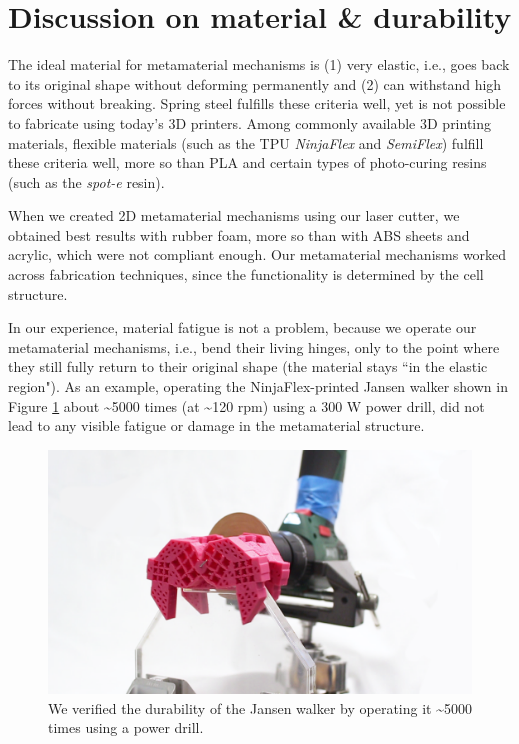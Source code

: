 \section{Discussion on material \& durability}

The ideal material for metamaterial mechanisms is (1) very elastic, i.e., goes back to its original shape without deforming permanently and (2) can withstand high forces without breaking. Spring steel fulfills these criteria well, yet is not possible to fabricate using today’s 3D printers. Among commonly available 3D printing materials, flexible materials (such as the TPU \textit{NinjaFlex} and \textit{SemiFlex}) fulfill these criteria well, more so than PLA and certain types of photo-curing resins (such as the \textit{spot-e} resin).

When we created 2D metamaterial mechanisms using our laser cutter, we obtained best results with rubber foam, more so than with ABS sheets and acrylic, which were not compliant enough. Our metamaterial mechanisms worked across fabrication techniques, since the functionality is determined by the cell structure. 

In our experience, material fatigue is not a problem, because we operate our metamaterial mechanisms, i.e., bend their living hinges, only to the point where they still fully return to their original shape (the material stays ``in the elastic region"). As an example, operating the NinjaFlex-printed Jansen walker shown in Figure \ref{fig:26-durability-test-jansen} about {\textasciitilde}5000 times (at {\textasciitilde}120 rpm) using a 300 W power drill, did not lead to any visible fatigue or damage in the metamaterial structure. 

\begin{figure} [h]  
    \includegraphics[width=\textwidth]{chapters/metamaterial-mechanisms-FIG/26-durability-test-jansen.png}
    \caption[Short figure name.]{We verified the durability of the Jansen walker by operating it {\textasciitilde}5000 times using a power drill.
    \label{fig:26-durability-test-jansen}}
\end{figure}

